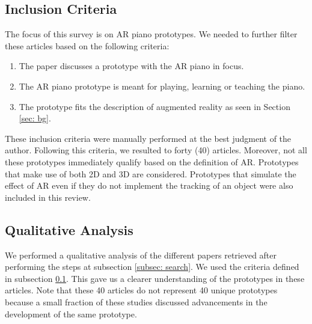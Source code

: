 \documentclass[sigchi, review]{acmart}
\begin{document}
\subsection{Inclusion Criteria}
\label{subsec: criteria}
The focus of this survey is on AR piano prototypes. We needed to further filter these articles based on the following criteria:
\begin{enumerate}
    \item The paper discusses a prototype with the AR piano in focus.  
    \item The AR piano prototype is meant for playing, learning or teaching the piano.
    \item The prototype fits the description of augmented reality as seen in Section \ref{sec: bg}.
\end{enumerate}
These inclusion criteria were manually performed at the best judgment of the author. Following this criteria, we resulted to forty (40) articles. Moreover, not all these prototypes immediately qualify based on the definition of AR. Prototypes that make use of both 2D and 3D are considered. Prototypes that simulate the effect of AR even if they do not implement the tracking of an object were also included in this review. 

\subsection{Qualitative Analysis}
We performed a qualitative analysis of the different papers retrieved after performing the steps at subsection \ref{subsec: search}. We used the criteria defined in subsection \ref{subsec: criteria}. This gave us a clearer understanding of the prototypes in these articles. Note that these 40 articles do not represent 40 unique prototypes because a small fraction of these studies discussed advancements in the development of the same prototype.
\end{document}
